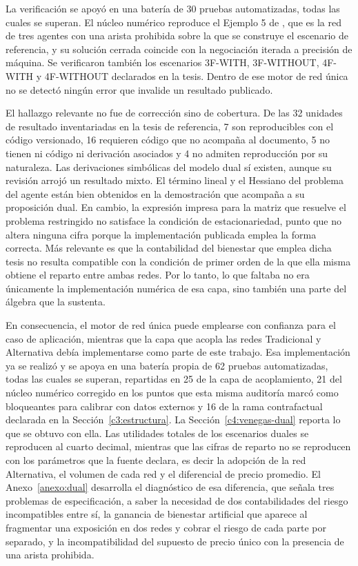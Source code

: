 La verificación se apoyó en una batería de 30 pruebas automatizadas, todas las
cuales se superan. El núcleo numérico reproduce el Ejemplo 5 de
, que es la red de tres agentes con una arista
prohibida sobre la que se construye el escenario de referencia, y su solución
cerrada coincide con la negociación iterada a precisión de máquina. Se
verificaron también los escenarios 3F-WITH, 3F-WITHOUT, 4F-WITH y 4F-WITHOUT
declarados en la tesis. Dentro de ese motor de red única no se detectó ningún
error que invalide un resultado publicado.

El hallazgo relevante no fue de corrección sino de cobertura. De las 32 unidades
de resultado inventariadas en la tesis de referencia, 7 son reproducibles con el
código versionado, 16 requieren código que no acompaña al documento, 5 no tienen
ni código ni derivación asociados y 4 no admiten reproducción por su naturaleza.
Las derivaciones simbólicas del modelo dual sí existen, aunque su revisión
arrojó un resultado mixto. El término lineal y el Hessiano del problema del
agente están bien obtenidos en la demostración que acompaña a su proposición
dual. En cambio, la expresión impresa para la matriz que resuelve el problema
restringido no satisface la condición de estacionariedad, punto que no altera
ninguna cifra porque la implementación publicada emplea la forma correcta. Más
relevante es que la contabilidad del bienestar que emplea dicha tesis no resulta
compatible con la condición de primer orden de la que ella misma obtiene el
reparto entre ambas redes. Por lo tanto, lo que faltaba no era únicamente la
implementación numérica de esa capa, sino también una parte del álgebra que la
sustenta.

En consecuencia, el motor de red única puede emplearse con confianza para el
caso de aplicación, mientras que la capa que acopla las redes Tradicional y
Alternativa debía implementarse como parte de este trabajo. Esa implementación
ya se realizó y se apoya en una batería propia de 62 pruebas automatizadas, todas
las cuales se superan, repartidas en 25 de la capa de acoplamiento, 21 del núcleo
numérico corregido en los puntos que esta misma auditoría marcó como bloqueantes
para calibrar con datos externos y 16 de la rama contrafactual declarada en la
Sección~\ref{c3:estructura}. La Sección~\ref{c4:venegas-dual} reporta lo que se obtuvo con ella.
Las utilidades totales de los escenarios duales se reproducen al cuarto decimal,
mientras que las cifras de reparto no se reproducen con los parámetros que la
fuente declara, es decir la adopción de la red Alternativa, el volumen de cada
red y el diferencial de precio promedio. El Anexo~\ref{anexo:dual} desarrolla el
diagnóstico de esa diferencia, que señala tres problemas de especificación, a
saber la necesidad de dos contabilidades del riesgo incompatibles entre sí, la
ganancia de bienestar artificial que aparece al fragmentar una exposición en dos
redes y cobrar el riesgo de cada parte por separado, y la incompatibilidad del
supuesto de precio único con la presencia de una arista prohibida.

